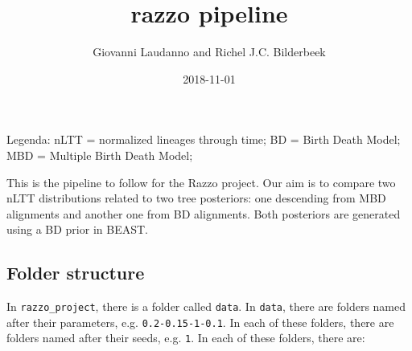 \documentclass[]{article}
\title{razzo pipeline}
\author{Giovanni Laudanno and Richel J.C. Bilderbeek}
\date{2018-11-01}
\begin{document}
\maketitle

Legenda: nLTT = normalized lineages through time; BD = Birth Death
Model; MBD = Multiple Birth Death Model;

This is the pipeline to follow for the Razzo project. Our aim is to
compare two nLTT distributions related to two tree posteriors: one
descending from MBD alignments and another one from BD alignments. Both
posteriors are generated using a BD prior in BEAST.

\subsection{Folder structure}\label{folder-structure}

In \texttt{razzo\_project}, there is a folder called \texttt{data}. In
\texttt{data}, there are folders named after their parameters, e.g.
\texttt{0.2-0.15-1-0.1}. In each of these folders, there are folders
named after their seeds, e.g. \texttt{1}. In each of these folders,
there are:
\end{document}
